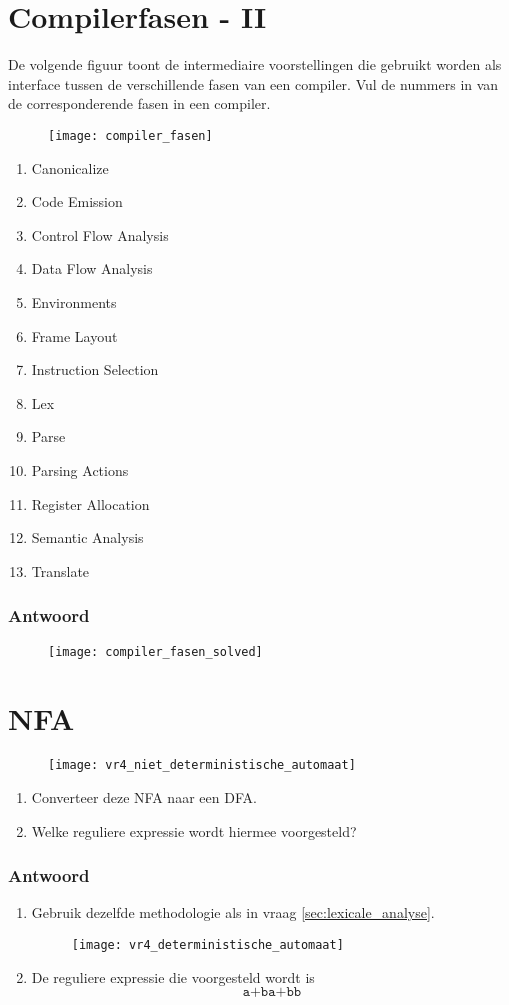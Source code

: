 \documentclass{report}
\newcommand{\answer}[1]{
		\subsubsection*{Antwoord}
			#1
}
\begin{document}
	\newpage
	\section{Compilerfasen - II}
	
	De volgende figuur toont de intermediaire voorstellingen die gebruikt worden als interface tussen de verschillende fasen van een compiler. Vul de nummers in van de corresponderende fasen in een compiler.
	\begin{figure}[ht]
		\texttt{[image: compiler\_fasen]}
	\end{figure}
	\begin{enumerate}
		\item Canonicalize
		\item Code Emission
		\item Control Flow Analysis
		\item Data Flow Analysis
		\item Environments
		\item Frame Layout
		\item Instruction Selection
		\item Lex
		\item Parse
		\item Parsing Actions
		\item Register Allocation
		\item Semantic Analysis
		\item Translate
	\end{enumerate}
	\answer{
		\begin{figure}[ht]
			\texttt{[image: compiler\_fasen\_solved]}
		\end{figure}
	}

	\newpage
	\section{NFA}
	\begin{figure}[ht]
		\texttt{[image: vr4\_niet\_deterministische\_automaat]}
	\end{figure}
	\begin{enumerate}
		\item Converteer deze NFA naar een DFA.
		\item Welke reguliere expressie wordt hiermee voorgesteld?
	\end{enumerate}
	\answer{
		\begin{enumerate}
			\item Gebruik dezelfde methodologie als in vraag \ref{sec:lexicale_analyse}.	\begin{figure}[ht]
				\centering
				\texttt{[image: vr4\_deterministische\_automaat]}
			\end{figure}
		\item De reguliere expressie die voorgesteld wordt is $$\texttt{a+ba+bb}$$
		\todo{hoe bekomen}
		\end{enumerate}
	}
	
	
\end{document}
